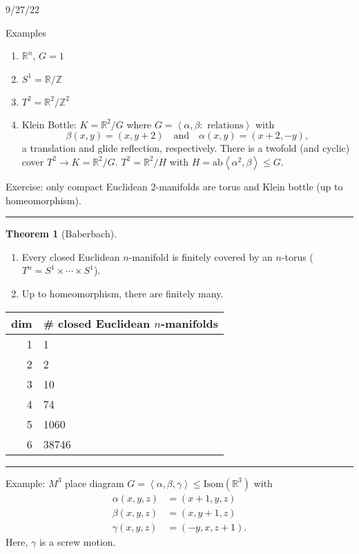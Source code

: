 \documentclass[12pt]{article}
\newcommand{\sepline}{\rule{\textwidth}{0.4pt}}
\theoremstyle{definition}
\newtheorem{theorem}{Theorem}
\newcommand{\isp}[1]{\quad\text{#1}\quad}
\newcommand{\Z}{\mathbb{Z}}
\newcommand{\R}{\mathbb{R}}
\newcommand{\<}{\left\langle}
\renewcommand{\>}{\right\rangle}
\newcommand{\Isom}{\mathrm{Isom}}
\begin{document}
9/27/22

Examples
\begin{enumerate}
    \item $\R^n$, $G = 1$
    \item $S^1 = \R/\Z$
    \item $T^2 = \R^2/\Z^2$
    \item Klein Bottle: $K = \R^2/G$ where $G = \<\alpha, \beta : \text{ relations}\>$ with
    \[
        \beta(x, y) = (x, y + 2) \isp{and} \alpha(x, y) = (x + 2, -y),
    \]
    a translation and glide reflection, respectively.
    There is a twofold (and cyclic) cover $T^2 \to K = \R^2/G$.
    $T^2 = \R^2/H$ with $H = \mathrm{ab}\<\alpha^2, \beta\> \leq G$. 
\end{enumerate}

Exercise: only compact Euclidean $2$-manifolds are torus and Klein bottle (up to homeomorphism).

\sepline

\begin{theorem}[Baberbach]
    \begin{enumerate}
        \item Every closed Euclidean $n$-manifold is finitely covered by an $n$-torus ($T^n = S^1 \times \cdots \times S^1$).
        \item Up to homeomorphism, there are finitely many.
    \end{enumerate}
\end{theorem}

\begin{center}
    \begin{tabular}{r|l}
        dim & \# closed Euclidean $n$-manifolds \\
        \hline
        1 & 1 \\
        2 & 2 \\
        3 & 10 \\
        4 & 74 \\
        5 & 1060 \\
        6 & 38746
    \end{tabular}
\end{center}

\sepline

Example: $M^3$ place diagram
$G = \<\alpha, \beta, \gamma\> \leq \Isom(\R^3)$ with
\begin{align*}
    \alpha(x, y, z) &= (x + 1, y, z) \\
    \beta(x, y, z) &= (x, y + 1, z) \\
    \gamma(x, y, z) &= (-y, x, z + 1).
\end{align*}
Here, $\gamma$ is a screw motion.
\end{document}
